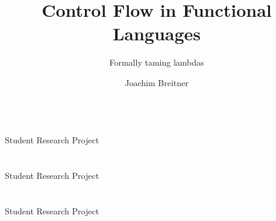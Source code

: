 \documentclass[a4paper,parskip=half,DIV=10,twoside=false,12pt]{scrbook}
\author{Joachim Breitner}
\title{Control Flow in Functional Languages}
\subtitle{Formally taming lambdas}
\theoremstyle{plain}
\theoremstyle{nonumberplain}
\begin{document}
\begin{titlepage}
\centering
\makeatletter
{\Large \@author} \\
\vspace{2em}
{\large Student Research Project}\\
\vspace{2.5em}
{\sectfont\LARGE \@title }\\
\vspace{2em}
{\sectfont\Large \@subtitle }
\vfill
{\Large \@author} \\
\vspace{2em}
{\large Student Research Project}\\
\vspace{2.5em}
{\sectfont\LARGE \@title }\\
\vspace{2em}
{\sectfont\Large \@subtitle }
\vfill
{\Large \@author} \\
\vspace{2em}
{\large Student Research Project}\\
\vspace{2.5em}
{\sectfont\LARGE \@title }\\
\vspace{2em}
{\sectfont\Large \@subtitle }
\vfill
\makeatother
\end{titlepage}
\end{document}
